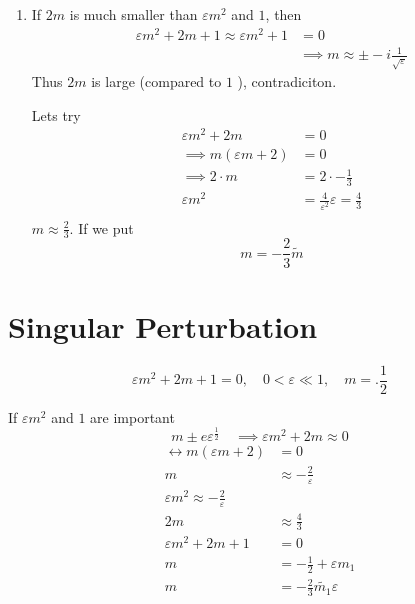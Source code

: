 \documentclass{article}
\theoremstyle{remark}
\newcommand{\newpara}
  {
  \vskip 0.4cm
  }
\begin{document}
 \begin{enumerate}[label=(\roman*)]
   \item If $2m$ is much smaller than $\varepsilon m^2 $ and $1$, then \[
       \begin{split}
   \varepsilon m^2 + 2m + 1 \approx \varepsilon m^2 + 1 &= 0 \\
     &  \implies m \approx \pm -i \frac{1}{\sqrt{\varepsilon } }
       \end{split} 
   \] 
   Thus $2m$ is large (compared to $1$ ), contradiciton. 

\newpara
Lets try \[
  \begin{split}
\varepsilon m^2 + 2m &= 0 \\
\implies  m\left( \varepsilon  m + 2 \right) &= 0 \\ 
\implies  2\cdot  m &= 2\cdot -\frac{1}{3} \\
\varepsilon m^2 &= \frac{4}{\varepsilon ^2} \varepsilon  = \frac{4}{3} \\
  \end{split} 
\]  
$m \approx \frac{2}{3}$. If we put \[
m = -\frac{2}{3}  \widetilde{m} 
\] 

 \end{enumerate}


\newpage
\section{Singular Perturbation}%
\label{sec:singular_perturbation}


\[
\varepsilon m^2 +  2m + 1 = 0, \quad  0< \varepsilon  \ll  1 , \quad m = .\frac{1}{2}  
\] 

If $\varepsilon m^2$ and $1$ are important \[
m \pm e \varepsilon ^{\frac{1}{2}} \quad  \implies  \varepsilon  m^2 + 2m \approx 0  
\] 
\[
\begin{split}
  \leftrightarrow  m\left( \varepsilon  m + 2  \right) &=  0 \\
  m  & \approx -\frac{2}{\varepsilon } \\
  \varepsilon  m^2 \approx -\frac{2}{\varepsilon } \\
  2m  &  \approx \frac{4}{3} \\
  \varepsilon m^2 + 2m + 1 &=  0 \\
  m &=  -\frac{1}{2} + \varepsilon  m_{1} \\
  m&=  -\frac{2}{3} \widetilde{m_{1}} \varepsilon  \\
\end{split} 
\] 
\end{document}
